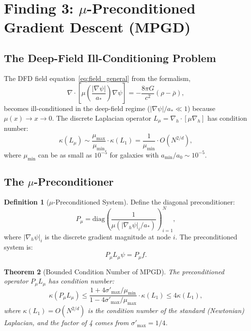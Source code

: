 \documentclass[11pt]{article}
\newtheorem{theorem}{Theorem}[section]
\theoremstyle{definition}
\newtheorem{definition}[theorem]{Definition}
\theoremstyle{remark}
\begin{document}
\section{Finding 3: $\mu$-Preconditioned Gradient Descent (MPGD)}
\label{sec:mpgd}

\subsection{The Deep-Field Ill-Conditioning Problem}
\label{sec:ill-conditioning}

The DFD field equation~\eqref{eq:field_general} from the formalism,
\begin{equation}
  \nabla \cdot \left[\mu\!\left(\frac{|\nabla\psi|}{a_*}\right)\nabla\psi\right]
  = -\frac{8\pi G}{c^2}(\rho - \bar\rho),
  \label{eq:dfd-field-eq}
\end{equation}
becomes ill-conditioned in the deep-field regime ($|\nabla\psi|/a_* \ll 1$)
because $\mu(x) \to x \to 0$. The discrete Laplacian operator
$L_\mu = \nabla_h \cdot [\mu \nabla_h]$ has condition number:
\begin{equation}
  \kappa(L_\mu) \sim \frac{\mu_{\max}}{\mu_{\min}} \cdot \kappa(L_1)
  = \frac{1}{\mu_{\min}} \cdot O(N^{2/d}),
  \label{eq:condition-number}
\end{equation}
where $\mu_{\min}$ can be as small as $10^{-5}$ for galaxies with
$a_{\min}/a_0 \sim 10^{-5}$.

\subsection{The $\mu$-Preconditioner}
\label{sec:mu-preconditioner}

\begin{definition}[$\mu$-Preconditioned System]
\label{def:mpgd}
Define the diagonal preconditioner:
\begin{equation}
  P_\mu = \text{diag}\!\left(\frac{1}{\mu(|\nabla_h\psi|_i/a_*)}\right)_{i=1}^N,
  \label{eq:preconditioner}
\end{equation}
where $|\nabla_h\psi|_i$ is the discrete gradient magnitude at node $i$.
The preconditioned system is:
\begin{equation}
  P_\mu L_\mu \psi = P_\mu f.
  \label{eq:preconditioned-system}
\end{equation}
\end{definition}

\begin{theorem}[Bounded Condition Number of MPGD]
\label{thm:mpgd-conditioning}
The preconditioned operator $P_\mu L_\mu$ has condition number:
\begin{equation}
  \kappa(P_\mu L_\mu) \leq \frac{1 + 4\sigma'_{\max}/\mu_{\min}}{1 - 4\sigma'_{\max}/\mu_{\max}}
  \cdot \kappa(L_1) \leq 4\kappa(L_1),
  \label{eq:preconditioned-kappa}
\end{equation}
where $\kappa(L_1) = O(N^{2/d})$ is the condition number of the standard
(Newtonian) Laplacian, and the factor of 4 comes from $\sigma'_{\max} = 1/4$.
\end{theorem}
\end{document}
